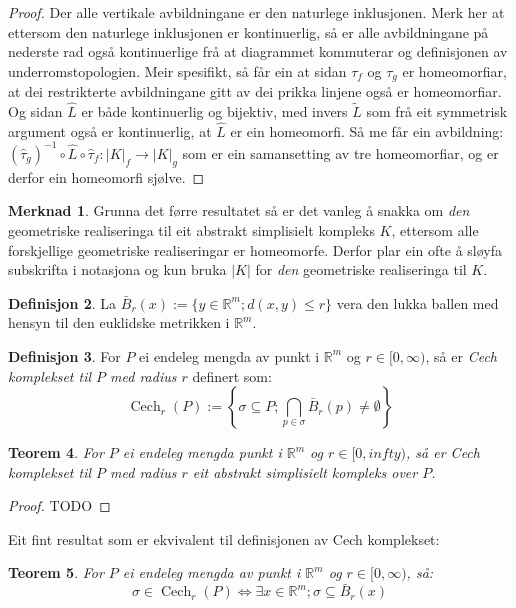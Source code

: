 \documentclass[a4paper, titlepage, 12pt, norsk]{article}
\theoremstyle{plain}
\newtheorem{theorem}{Teorem}[section]
\theoremstyle{definition}
\newtheorem{definition}[theorem]{Definisjon}
\newtheorem{remark}[theorem]{Merknad}
\newcommand{\Rb}{\mathbb{R}}
\newcommand{\Cech}{\operatorname{Cech}}
\begin{document}
\begin{proof}
Der alle vertikale avbildningane er den naturlege inklusjonen.
Merk her at ettersom den naturlege inklusjonen er kontinuerlig, så er alle avbildningane på nederste rad også kontinuerlige frå at diagrammet kommuterar og definisjonen av underromstopologien. Meir spesifikt, så får ein at sidan $\tau_f$ og $\tau_g$ er homeomorfiar, at dei restrikterte avbildningane gitt av dei prikka linjene også er homeomorfiar.
Og sidan $\hat{L}$ er både kontinuerlig og bijektiv, med invers $\tilde{L}$ som frå eit symmetrisk argument også er kontinuerlig, at $\hat{L}$ er ein homeomorfi.
Så me får ein avbildning: $(\hat{\tau}_g)^{-1}\circ\hat{L}\circ\hat{\tau}_f:|K|_f\to|K|_g$ som er ein samansetting av tre homeomorfiar, og er derfor ein homeomorfi sjølve.
\end{proof}
\begin{remark}
	Grunna det førre resultatet så er det vanleg å snakka om \emph{den} geometriske realiseringa til eit abstrakt simplisielt kompleks $K$, ettersom alle forskjellige geometriske realiseringar er homeomorfe. Derfor plar ein ofte å sløyfa subskrifta i notasjona og kun bruka $|K|$ for \emph{den} geometriske realiseringa til $K$.
\end{remark}
\begin{definition}
	La $\bar{B}_r(x):=\{y\in\Rb^m; d(x, y)\leq r\}$ vera den lukka ballen med hensyn til den euklidske metrikken i $\Rb^m$.
\end{definition}
\begin{definition}
	For $P$ ei endeleg mengda av punkt i $\Rb^m$ og $r\in[0,\infty)$, så er \emph{Cech komplekset til $P$ med radius $r$} definert som:
	\begin{equation*}
		\Cech_r(P):=\left\{\sigma\subseteq P; \bigcap_{p\in\sigma}\bar{B}_r(p)\neq\emptyset\right\}
	\end{equation*}
\end{definition}
\begin{theorem}
	For $P$ ei endeleg mengda punkt i $\Rb^m$ og $r\in[0,infty)$, så er Cech komplekset til $P$ med radius $r$ eit abstrakt simplisielt kompleks over $P$.
\end{theorem}
\begin{proof}
	TODO
\end{proof}
Eit fint resultat som er ekvivalent til definisjonen av Cech komplekset:
\begin{theorem}
	For $P$ ei endeleg mengda av punkt i $\Rb^m$ og $r\in[0, \infty)$, så:
	\begin{equation*}
		\sigma\in \Cech_r(P) \Longleftrightarrow \exists x\in\Rb^m; \sigma \subseteq \bar{B}_r(x)
	\end{equation*}
\end{theorem}
\end{document}
